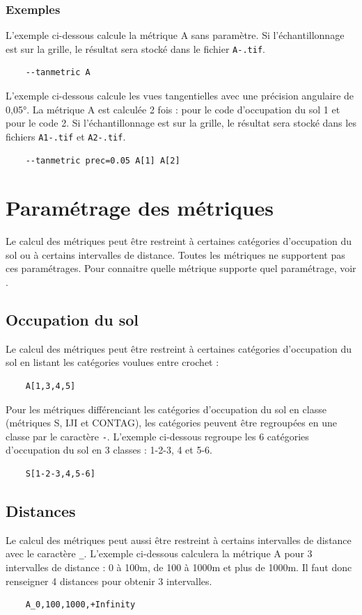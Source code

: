 \documentclass{report}
\begin{document}
\subsubsection{Exemples}

L'exemple ci-dessous calcule la métrique A sans paramètre. Si l'échantillonnage est sur la grille, le résultat sera stocké dans le fichier \verb|A-.tif|.
\begin{Verbatim}
	--tanmetric A
\end{Verbatim}

L'exemple ci-dessous calcule les vues tangentielles avec une précision angulaire de 0,05°. La métrique A est calculée 2 fois : pour le code d'occupation du sol 1 et pour le code 2. Si l'échantillonnage est sur la grille, le résultat sera stocké dans les fichiers \verb|A1-.tif| et \verb|A2-.tif|.
\begin{Verbatim}
	--tanmetric prec=0.05 A[1] A[2]
\end{Verbatim}


\section{Paramétrage des métriques}
\label{param_metrics_cli}
Le calcul des métriques peut être restreint à certaines catégories d'occupation du sol ou à certains intervalles de distance. Toutes les métriques ne supportent pas ces paramétrages. Pour connaitre quelle métrique supporte quel paramétrage, voir .

\subsection{Occupation du sol}
Le calcul des métriques peut être restreint à certaines catégories d'occupation du sol en listant les catégories voulues entre crochet :
\begin{Verbatim}
	A[1,3,4,5]
\end{Verbatim}

Pour les métriques différenciant les catégories d'occupation du sol en classe (métriques S, IJI et CONTAG), les catégories peuvent être regroupées en une classe par le caractère \verb|-|. L'exemple ci-dessous regroupe les 6 catégories d'occupation du sol en 3 classes : 1-2-3, 4 et 5-6.
\begin{Verbatim}
	S[1-2-3,4,5-6]
\end{Verbatim}

\subsection{Distances}
Le calcul des métriques peut aussi être restreint à certains intervalles de distance avec le caractère \verb|_|. L'exemple ci-dessous calculera la métrique A pour 3 intervalles de distance : 0 à 100m, de 100 à 1000m et plus de 1000m. Il faut donc renseigner 4 distances pour obtenir 3 intervalles.
\begin{Verbatim}
	A_0,100,1000,+Infinity
\end{Verbatim}
\end{document}
